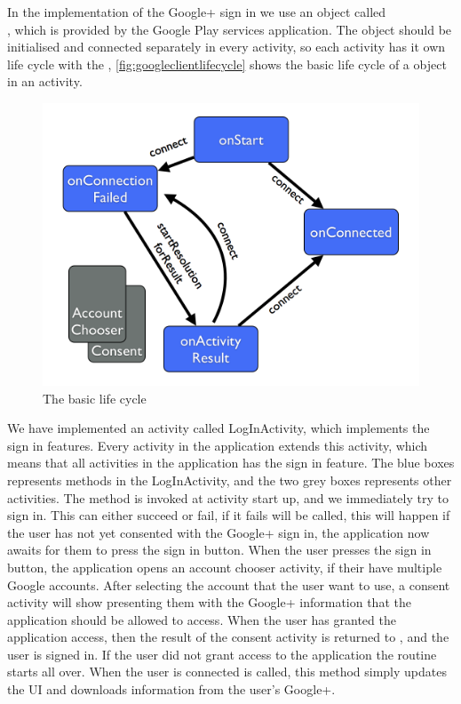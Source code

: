 In the implementation of the Google+ sign in we use an object called \\\citep{googleapiclient-docs}, which is provided by the Google Play services application. 
The object  should be initialised and connected separately in every activity, so each activity has it own life cycle with the , \autoref{fig:googleclientlifecycle} shows the basic life cycle of a  object in an activity.
\begin{figure}[H]
\centering
\includegraphics[width=0.75\linewidth]{img/googleclientflow.png}
\caption{The  basic life cycle\cite{googleapiclient-lifecycle}}
\label{fig:googleclientlifecycle}
\end{figure}
We have implemented an activity called LogInActivity, which implements the sign in features. Every activity in the application extends this activity, which means that all activities in the application has the sign in feature. 
The blue boxes represents methods in the LogInActivity, and the two grey boxes represents other activities. The method  is invoked at activity start up, and we immediately try to sign in. 
This can either succeed or fail, if it fails  will be called, this will happen if the user has not yet consented with the Google+ sign in, the application now awaits for them to press the sign in button. 
When the user presses the sign in button, the application opens an account chooser activity, if their have multiple Google accounts. 
After selecting the account that the user want to use, a consent activity will show presenting them with the Google+ information that the application should be allowed to access. 
When the user has granted the application access, then the result of the consent activity is returned to , and the user is signed in. 
If the user did not grant access to the application the routine starts all over. When the user is connected  is called, this method simply updates the UI and downloads information from the user's Google+.


